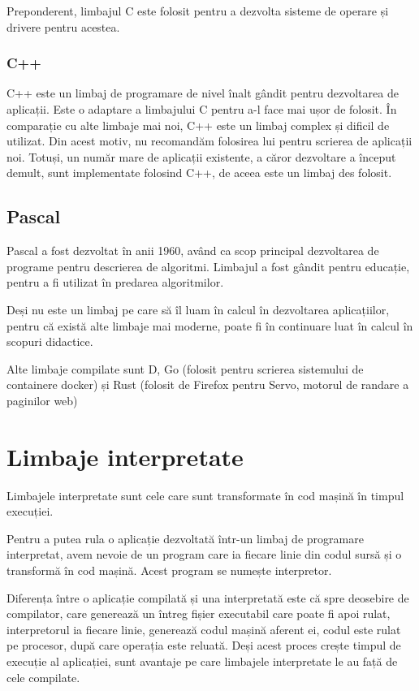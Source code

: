 Preponderent, limbajul C este folosit pentru a dezvolta sisteme de operare și
drivere pentru acestea.

\subsubsection{C++}
\label{sec:appdev-langs-comp-ex-cpp}

C++ este un limbaj de programare de nivel înalt gândit pentru dezvoltarea de
aplicații. Este o adaptare a limbajului C pentru a-l face mai ușor de folosit.
În comparație cu alte limbaje mai noi, C++ este un limbaj complex și dificil de
utilizat. Din acest motiv, nu recomandăm folosirea lui pentru scrierea de
aplicații noi. Totuși, un număr mare de aplicații existente, a căror dezvoltare
a început demult, sunt implementate folosind C++, de aceea este un limbaj des
folosit.

\subsection{Pascal}
\label{sec:appdev-langs-comp-ex-pascal}

Pascal a fost dezvoltat în anii 1960, având ca scop principal dezvoltarea de
programe pentru descrierea de algoritmi. Limbajul a fost gândit pentru educație,
pentru a fi utilizat în predarea algoritmilor.

Deși nu este un limbaj pe care să îl luam în calcul în dezvoltarea aplicațiilor,
pentru că există alte limbaje mai moderne, poate fi în continuare luat în calcul
în scopuri didactice.

Alte limbaje compilate sunt D, Go (folosit pentru scrierea sistemului de
containere docker) și Rust (folosit de Firefox pentru Servo, motorul de randare
a paginilor web)

\section{Limbaje interpretate}
\label{sec:appdev-langs-int}

Limbajele interpretate sunt cele care sunt transformate în cod mașină în timpul
execuției.

Pentru a putea rula o aplicație dezvoltată într-un limbaj de programare
interpretat, avem nevoie de un program care ia fiecare linie din codul sursă și
o transformă în cod mașină. Acest program se numește interpretor.

Diferența între o aplicație compilată și una interpretată este că spre deosebire
de compilator, care generează un întreg fișier executabil care poate fi apoi
rulat, interpretorul ia fiecare linie, generează codul mașină aferent ei, codul
este rulat pe procesor, după care operația este reluată. Deși acest proces
crește timpul de execuție al aplicației, sunt avantaje pe care limbajele
interpretate le au față de cele compilate.

